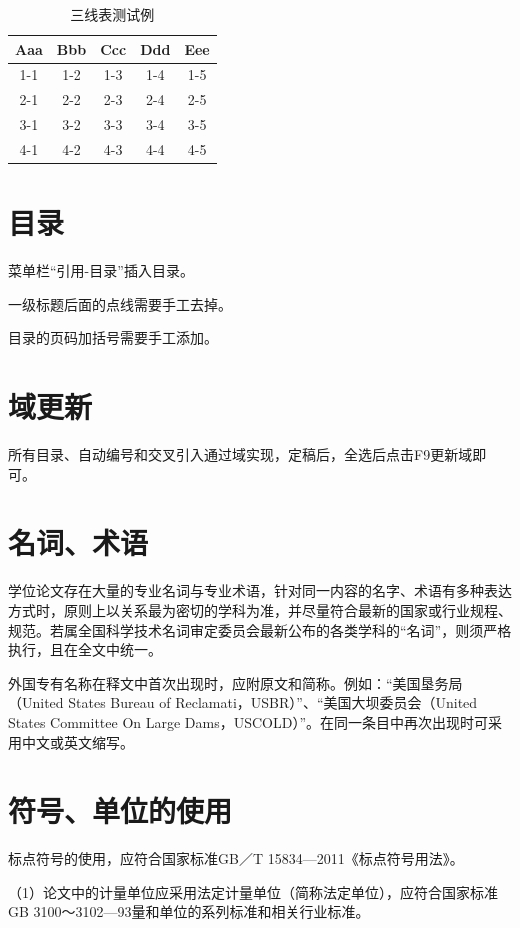 \begin{table}[htbp]
  \centering
  \caption{三线表测试例}
    \begin{tabular}{ccccc}
    \toprule
    Aaa & Bbb & Ccc & Ddd & Eee \\
    \midrule
    1-1  & 1-2  & 1-3 & 1-4 & 1-5 \\
    2-1  & 2-2  & 2-3 & 2-4 & 2-5 \\
    3-1  & 3-2  & 3-3 & 3-4 & 3-5 \\
    4-1  & 4-2  & 4-3 & 4-4 & 4-5 \\
    \bottomrule
    \end{tabular}
  \label{Tab2-2}
\end{table}


\section{目录}
菜单栏“引用-目录”插入目录。

一级标题后面的点线需要手工去掉。

目录的页码加括号需要手工添加。

\section{域更新}
所有目录、自动编号和交叉引入通过域实现，定稿后，全选后点击F9更新域即可。

\section{名词、术语}
学位论文存在大量的专业名词与专业术语，针对同一内容的名字、术语有多种表达方式时，原则上以关系最为密切的学科为准，并尽量符合最新的国家或行业规程、规范。若属全国科学技术名词审定委员会最新公布的各类学科的“名词”，则须严格执行，且在全文中统一。

外国专有名称在释文中首次出现时，应附原文和简称。例如：“美国垦务局（United States Bureau of Reclamati，USBR）”、“美国大坝委员会（United States Committee On Large Dams，USCOLD）”。在同一条目中再次出现时可采用中文或英文缩写。

\section{符号、单位的使用}
标点符号的使用，应符合国家标准GB／T 15834—2011《标点符号用法》。

（1）论文中的计量单位应采用法定计量单位（简称法定单位），应符合国家标准GB 3100～3102—93量和单位的系列标准和相关行业标准。

